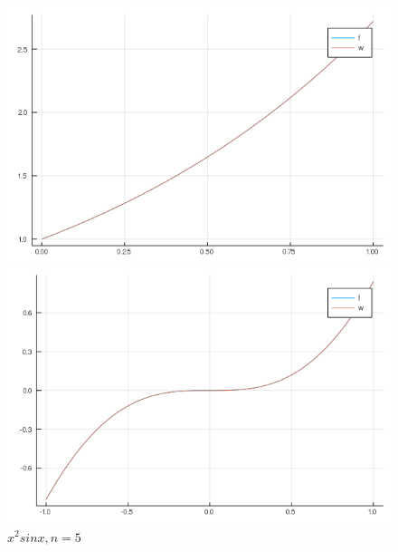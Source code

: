 \documentclass[12pt]{article}
\begin{document}
\begin{figure}[!htb]
  \includegraphics[width=\linewidth]{myplot_1_15.png}
  \caption{$e^x, n=15$}
\endminipage\hfill
{}
  \includegraphics[width=\linewidth]{myplot_2_5.png}
  \caption{$x^2sin x, n=5$}
\endminipage
\end{figure}
\end{document}
